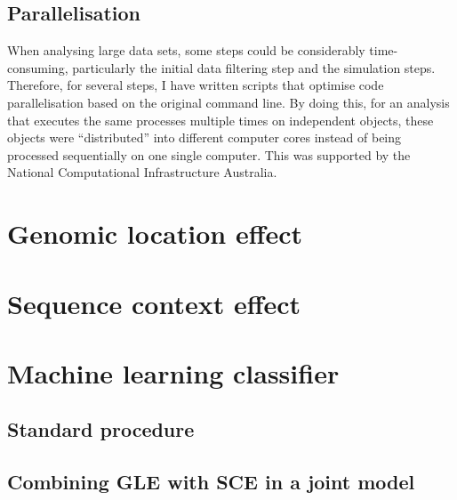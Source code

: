 \subsection{Parallelisation}
When analysing large data sets, some steps could be considerably time-consuming, particularly the initial data filtering step and the simulation steps. Therefore, for several steps, I have written scripts that optimise code parallelisation based on the original command line. By doing this, for an analysis that executes the same processes multiple times on independent objects, these objects were ``distributed'' into different computer cores instead of being processed sequentially on one single computer. This was supported by the National Computational Infrastructure Australia.


\section{Genomic location effect}
\section{Sequence context effect}
\section{Machine learning classifier}
\subsection{Standard procedure}
\subsection{Combining GLE with SCE in a joint model}
